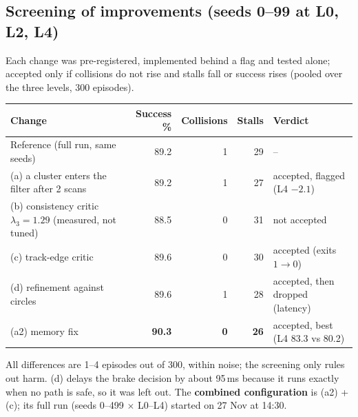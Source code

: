 \documentclass[11pt,a4paper]{article}
\begin{document}
\subsection{Screening of improvements (seeds 0--99 at L0, L2, L4)}
Each change was pre-registered, implemented behind a flag and tested alone; accepted only if collisions do not
rise and stalls fall or success rises (pooled over the three levels, 300 episodes).
\begin{table}[H]
\small
\begin{tabularx}{\linewidth}{@{}Lrrrl@{}}
\toprule
Change & Success \% & Collisions & Stalls & Verdict \\
\midrule
Reference (full run, same seeds) & 89.2 & 1 & 29 & -- \\
(a) a cluster enters the filter after 2 scans & 89.2 & 1 & 27 & accepted, flagged (L4 $-2.1$) \\
(b) consistency critic $\lambda_3=1.29$ (measured, not tuned) & 88.5 & 0 & 31 & not accepted \\
(c) track-edge critic & 89.6 & 0 & 30 & accepted (exits $1\to0$) \\
(d) refinement against circles & 89.6 & 1 & 28 & accepted, then dropped (latency) \\
(a2) memory fix & \textbf{90.3} & \textbf{0} & \textbf{26} & accepted, best (L4 83.3 vs 80.2) \\
\bottomrule
\end{tabularx}
\end{table}
All differences are 1--4 episodes out of 300, within noise; the screening only rules out harm. (d) delays the
brake decision by about 95\,ms because it runs exactly when no path is safe, so it was left out. The
\textbf{combined configuration} is (a2) + (c); its full run (seeds 0--499 $\times$ L0--L4) started on 27 Nov at 14:30.
\end{document}

